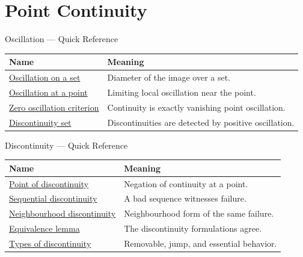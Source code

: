
\section{Point Continuity}

\begin{toolkitbox}{Oscillation --- Quick Reference}
\small
\begin{tabular}{l l}
\toprule
\textbf{Name} & \textbf{Meaning}\\
\midrule
\hyperref[def:oscillation-on-a-set]{Oscillation on a set} & Diameter of the image over a set.\\
\hyperref[def:oscillation-at-a-point]{Oscillation at a point} & Limiting local oscillation near the point.\\
\hyperref[thm:continuity-iff-zero-oscillation]{Zero oscillation criterion} & Continuity is exactly vanishing point oscillation.\\
\hyperref[prop:discontinuity-set-via-oscillation]{Discontinuity set} & Discontinuities are detected by positive oscillation.\\
\bottomrule
\end{tabular}
\end{toolkitbox}


\begin{toolkitbox}{Discontinuity --- Quick Reference}
\small
\begin{tabular}{l l}
\toprule
\textbf{Name} & \textbf{Meaning}\\
\midrule
\hyperref[def:point-of-discontinuity]{Point of discontinuity} & Negation of continuity at a point.\\
\hyperref[def:sequential-discontinuity-at-a-point]{Sequential discontinuity} & A bad sequence witnesses failure.\\
\hyperref[def:neighborhood-discontinuity-at-a-point]{Neighbourhood discontinuity} & Neighbourhood form of the same failure.\\
\hyperref[lem:equivalent-discontinuity-at-a-point]{Equivalence lemma} & The discontinuity formulations agree.\\
\hyperref[def:types-of-discontinuity-at-a-point]{Types of discontinuity} & Removable, jump, and essential behavior.\\
\bottomrule
\end{tabular}
\end{toolkitbox}


